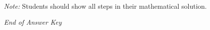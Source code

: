 \documentclass[12pt]{article}
\begin{document}
\begin{enumerate}[label=\arabic*.]
\\ \textit{Note:} Students should show all steps in their mathematical solution.
\end{enumerate}

\vfill
\noindent\textit{End of Answer Key}
\end{document}
